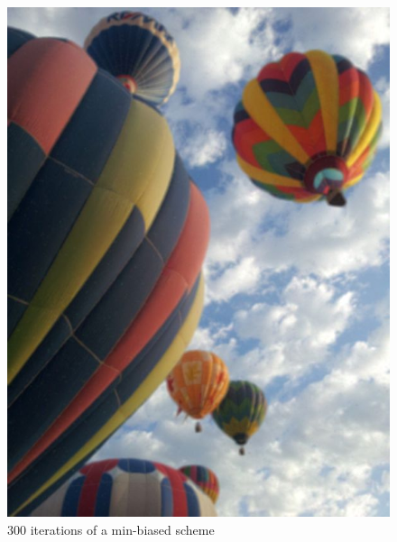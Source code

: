 \begin{figure}[ht]
\begin{minipage}[b]{0.45\linewidth}
\includegraphics[width=\textwidth]{baloons_resized_minbias.jpg}
\caption*{300 iterations of a min-biased scheme}
\end{minipage}
\hspace{0.5cm}
\begin{minipage}[b]{0.45\linewidth}
\centering

\end{minipage}
\end{figure}
